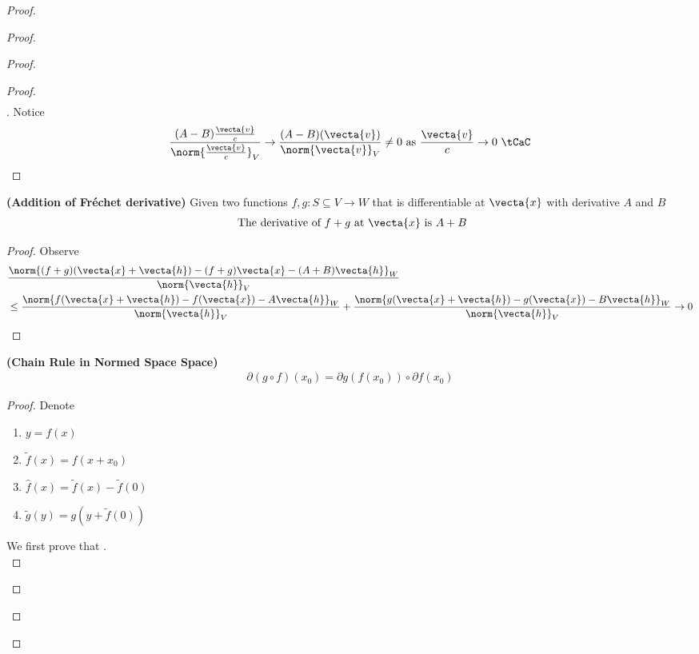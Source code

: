 \documentclass{report}
\begin{document}
\begin{proof}
\begin{proof}
\begin{proof}
\begin{proof}
\begin{align*}
\end{align*}
. Notice 
\begin{align*}
  \frac{(A-B) \frac{\vecta{v}}{c}}{\norm{\frac{\vecta{v}}{c}}_V}\to \frac{(A-B)(\vecta{v})}{\norm{\vecta{v}}_V} \neq 0 \text{ as $\frac{\vecta{v}}{c} \to 0$ }\tCaC
\end{align*}
\end{proof}
\begin{theorem}
\label{5.1.4}
\textbf{(Addition of Fréchet derivative)} Given two functions $f,g:S\subseteq V\rightarrow W$ that is differentiable at $\vecta{x}$ with derivative $A$ and  $B$ 
 \begin{align*}
\text{ The derivative of $f+g$ at  $\vecta{x}$ is }A+B
\end{align*}
\end{theorem}
\begin{proof}
Observe 
\begin{align*}
  &\frac{\norm{(f+g)(\vecta{x}+\vecta{h})-(f+g)\vecta{x}-(A+B)\vecta{h}}_W}{\norm{\vecta{h}}_V}\\
  &\leq \frac{\norm{f(\vecta{x}+\vecta{h})-f(\vecta{x})-A \vecta{h}}_W}{\norm{\vecta{h}}_V}+\frac{\norm{g(\vecta{x}+\vecta{h})-g(\vecta{x})-B\vecta{h}}_W}{\norm{\vecta{h}}_V} \to 0 
\end{align*}
\end{proof}
\begin{theorem}
\label{5.1.5}
\textbf{(Chain Rule in Normed Space Space)}  
\begin{align*}
\partial (g\circ f)(x_0)=\partial g(f(x_0)) \circ \partial f(x_0)
\end{align*}
\end{theorem}
\begin{proof}
Denote 
\begin{enumerate}[label=(\alph*)]
  \item $y=f(x)$ 
  \item  $\tilde{f}(x)=f(x+x_0)$ 
  \item $\hat{f}(x)=\tilde{f}(x)-\tilde{f}(0)$
  \item $\tilde{g}(y)=g(y+\tilde{f}(0))$
\end{enumerate}
  We first prove that .\\


\end{proof}
\end{proof}
\end{proof}
\end{proof}
\end{document}
